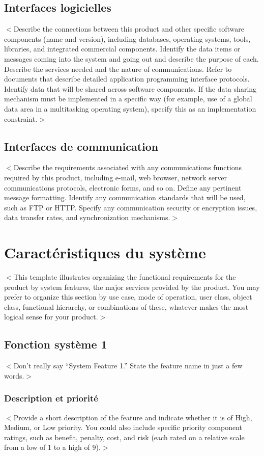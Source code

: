 \documentclass[titlepage]{report}
\begin{document}
\section{Interfaces logicielles}
$<$Describe the connections between this product and other specific software 
components (name and version), including databases, operating systems, tools, 
libraries, and integrated commercial components. Identify the data items or 
messages coming into the system and going out and describe the purpose of each.  
Describe the services needed and the nature of communications. Refer to 
documents that describe detailed application programming interface protocols.  
Identify data that will be shared across software components. If the data 
sharing mechanism must be implemented in a specific way (for example, use of a 
global data area in a multitasking operating system), specify this as an 
implementation constraint.$>$

\section{Interfaces de communication}
$<$Describe the requirements associated with any communications functions 
required by this product, including e-mail, web browser, network server 
communications protocols, electronic forms, and so on. Define any pertinent 
message formatting. Identify any communication standards that will be used, such 
as FTP or HTTP. Specify any communication security or encryption issues, data 
transfer rates, and synchronization mechanisms.$>$


\chapter{Caractéristiques du système}
$<$This template illustrates organizing the functional requirements for the 
product by system features, the major services provided by the product. You may 
prefer to organize this section by use case, mode of operation, user class, 
object class, functional hierarchy, or combinations of these, whatever makes the 
most logical sense for your product.$>$

\section{Fonction système 1}
$<$Don’t really say “System Feature 1.” State the feature name in just a few 
words.$>$

\subsection{Description et priorité}
$<$Provide a short description of the feature and indicate whether it is of 
High, Medium, or Low priority. You could also include specific priority 
component ratings, such as benefit, penalty, cost, and risk (each rated on a 
relative scale from a low of 1 to a high of 9).$>$
\end{document}
